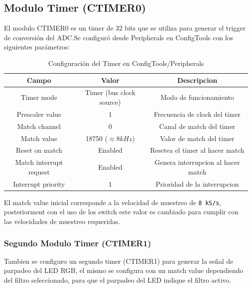 \documentclass[11pt,a4paper]{article}
\begin{document}
\subsection{Modulo Timer (CTIMER0)}

El modulo CTIMER0 es un timer de 32 bits que se utiliza para generar el trigger
de conversión del ADC.\@ Se configuró desde Peripherals en ConfigTools con los
siguientes parámetros:

\begin{table}[H]
    \centering
    \begin{tabular}{|c|c|c|}
        \hline
        \textbf{Campo}          & \textbf{Valor}           & \textbf{Descripcion}               \\
        \hline
        Timer mode              & Timer (bus clock source) & Modo de funcionamiento             \\
        Prescaler value         & 1                        & Frecuencia de clock del timer      \\
        Match channel           & 0                        & Canal de match del timer           \\
        Match value             & 18750 ($\approx 8kHz$)   & Valor de match del timer           \\
        Reset on match          & Enabled                  & Resetea el timer al hacer match    \\
        Match interrupt request & Enabled                  & Genera interrupcion al hacer match \\
        Interrupt priority      & 1                        & Prioridad de la interrupcion       \\
        \hline
    \end{tabular}
    \caption{Configuración del Timer en ConfigTools/Peripherals}
\end{table}

El match value inicial corresponde a la velocidad de muestreo de \texttt{8
    kS/s}, posteriorment con el uso de los switch este valor es cambiado para
cumplir con las velocidades de muestreo requeridas.

\subsubsection{Segundo Modulo Timer (CTIMER1)}

Tambien se configuro un segundo timer (CTIMER1) para generar la señal de
parpadeo del LED RGB, el mismo se configura con un match value dependiendo del
filtro seleccionado, para que el parpadeo del LED indique el filtro activo.
\end{document}

